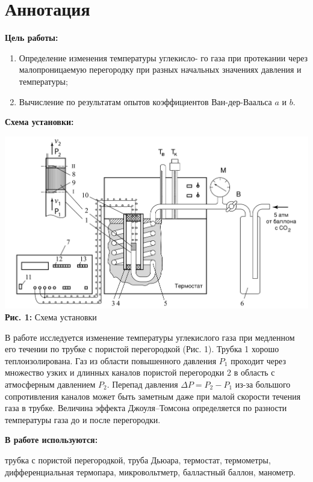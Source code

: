 \documentclass[12pt,a4paper]{scrartcl}
\begin{document}
	\section{Аннотация}
	
	\textbf{Цель работы: }
	
	\begin{enumerate}
		\item Определение изменения температуры углекисло-
		го газа при протекании через малопроницаемую перегородку при
		разных начальных значениях давления и температуры;
		\item Вычисление по результатам опытов коэффициентов Ван-дер-Ваальса $a$ и
		$b$.
	\end{enumerate}
	
	\textbf{Схема установки:}
	\begin{center}
		\includegraphics[scale=0.2]{PIC_1.png}
		\\\textbf{Рис. 1:} Схема установки
	\end{center}
		
	В работе исследуется изменение температуры углекислого газа	при медленном его течении по трубке с пористой перегородкой (Рис. 1). Трубка 1 хорошо теплоизолирована. Газ из области повышенного давления $P_1$ проходит через множество узких и длинных каналов пористой перегородки 2 в область с атмосферным давлением $P_2$. Перепад давления $\Delta P = P_2 - P_1$ из-за большого сопротивления каналов может быть заметным даже при малой скорости течения газа в трубке. Величина эффекта Джоуля–Томсона определяется по
	разности температуры газа до и после перегородки.	
		
	\textbf{В работе используются:}
	
	трубка с пористой перегородкой, труба Дьюара, термостат, термометры, дифференциальная термопара, микровольтметр, балластный баллон, манометр.
	
\end{document}
